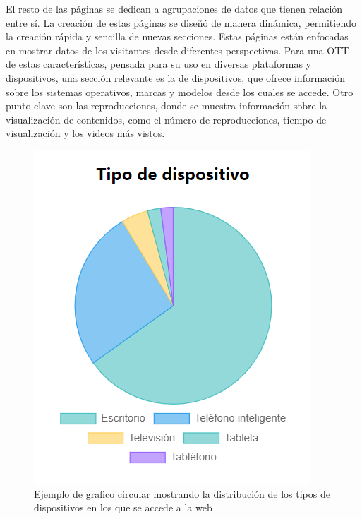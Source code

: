 El resto de las páginas se dedican a agrupaciones de datos que tienen relación entre sí. La creación de estas páginas se diseñó 
de manera dinámica, permitiendo la creación rápida y sencilla de nuevas secciones. Estas páginas están enfocadas en mostrar 
datos de los visitantes desde diferentes perspectivas. Para una OTT de estas características, pensada para su uso en diversas 
plataformas y dispositivos, una sección relevante es la de dispositivos, que ofrece información sobre los sistemas operativos, 
marcas y modelos desde los cuales se accede. Otro punto clave son las reproducciones, donde se muestra información sobre la 
visualización de contenidos, como el número de reproducciones, tiempo de visualización y los videos más vistos.


\begin{figure}[ht]
    \centering
    \begin{minipage}[b]{0.45\textwidth}
        \includegraphics[width=\textwidth]{imaxes/circleGraph.png}
        \caption{Ejemplo de grafico circular mostrando la distribución de los tipos de dispositivos en los que se accede a la web}
        \label{fig:circleGraph}

\end{minipage}
\end{figure}
